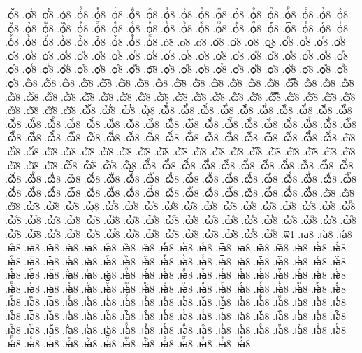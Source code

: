 {.ѻ҆᷶8
.ѻ᷷҆8
.ѻ᷸҆8
.ѻ᷹҆8
.ѻ҆ⷠ8
.ѻ҆ⷡ8
.ѻ҆ⷢ8
.ѻ҆ⷣ8
.ѻ҆ⷤ8
.ѻ҆ⷥ8
.ѻ҆ⷦ8
.ѻ҆ⷧ8
.ѻ҆ⷨ8
.ѻ҆ⷩ8
.ѻ҆ⷪ8
.ѻ҆ⷫ8
.ѻ҆ⷬ8
.ѻ҆ⷭ8
.ѻ҆ⷮ8
.ѻ҆ⷯ8
.ѻ҆ⷰ8
.ѻ҆ⷱ8
.ѻ҆ⷲ8
.ѻ҆ⷳ8
.ѻ҆ⷴ8
.ѻ҆ⷵ8
.ѻ҆ⷶ8
.ѻ҆ⷷ8
.ѻ҆ⷸ8
.ѻ҆ⷹ8
.ѻ҆ⷺ8
.ѻ҆ⷻ8
.ѻ҆ⷼ8
.ѻ҆ⷽ8
.ѻ҆ⷾ8
.ѻ҆ⷿ8
.ѻ҆꙯8
.ѻ҆ꙴ8
.ѻ҆ꙵ8
.ѻ҆ꙶ8
.ѻ҆ꙷ8
.ѻ҆ꙸ8
.ѻ҆ꙹ8
.ѻ҆ꙺ8
.ѻ҆ꙻ8
.ѻ҆꙼8
.ѻ҆꙽8
.ѻ҆ꚞ8
.ѻ҆ꚟ8
.ѻ҇8
.ѻ᷀8
.ѻ᷁8
.ѻ᷶8
.ѻ᷷8
.ѻ᷸8
.ѻ᷹8
.ѻⷠ8
.ѻⷡ8
.ѻⷢ8
.ѻⷣ8
.ѻⷤ8
.ѻⷥ8
.ѻⷦ8
.ѻⷧ8
.ѻⷨ8
.ѻⷩ8
.ѻⷪ8
.ѻⷫ8
.ѻⷬ8
.ѻⷭ8
.ѻⷮ8
.ѻⷯ8
.ѻⷰ8
.ѻⷱ8
.ѻⷲ8
.ѻⷳ8
.ѻⷴ8
.ѻⷵ8
.ѻⷶ8
.ѻⷷ8
.ѻⷸ8
.ѻⷹ8
.ѻⷺ8
.ѻⷻ8
.ѻⷼ8
.ѻⷽ8
.ѻⷾ8
.ѻⷿ8
.ѻ꙯8
.ѻꙴ8
.ѻꙵ8
.ѻꙶ8
.ѻꙷ8
.ѻꙸ8
.ѻꙹ8
.ѻꙺ8
.ѻꙻ8
.ѻ꙼8
.ѻ꙽8
.ѻꚞ8
.ѻꚟ8
.ѽ8
.ѽ̀8
.ѽ́8
.ѽ̂8
.ѽ̅8
.ѽ̆8
.ѽ̇8
.ѽ̈8
.ѽ̋8
.ѽ̏8
.ѽ̑8
.ѽ̓8
.ѽ̔8
.ѽ̾8
.ѽ̿8
.ѽ͘8
.ѽ҃8
.ѽ҄8
.ѽ҅8
.ѽ҅̀8
.ѽ҅́8
.ѽ҅̂8
.ѽ҅̅8
.ѽ҅̆8
.ѽ҅̇8
.ѽ҅̈8
.ѽ҅̋8
.ѽ҅̏8
.ѽ҅̑8
.ѽ҅̓8
.ѽ҅̔8
.ѽ҅̾8
.ѽ҅̿8
.ѽ҅͘8
.ѽ҅҃8
.ѽ҅҄8
.ѽ҅҅8
.ѽ҅҆8
.ѽ҅҇8
.ѽ҅᷀8
.ѽ҅᷁8
.ѽ҅᷶8
.ѽ᷷҅8
.ѽ᷸҅8
.ѽ᷹҅8
.ѽ҅ⷠ8
.ѽ҅ⷡ8
.ѽ҅ⷢ8
.ѽ҅ⷣ8
.ѽ҅ⷤ8
.ѽ҅ⷥ8
.ѽ҅ⷦ8
.ѽ҅ⷧ8
.ѽ҅ⷨ8
.ѽ҅ⷩ8
.ѽ҅ⷪ8
.ѽ҅ⷫ8
.ѽ҅ⷬ8
.ѽ҅ⷭ8
.ѽ҅ⷮ8
.ѽ҅ⷯ8
.ѽ҅ⷰ8
.ѽ҅ⷱ8
.ѽ҅ⷲ8
.ѽ҅ⷳ8
.ѽ҅ⷴ8
.ѽ҅ⷵ8
.ѽ҅ⷶ8
.ѽ҅ⷷ8
.ѽ҅ⷸ8
.ѽ҅ⷹ8
.ѽ҅ⷺ8
.ѽ҅ⷻ8
.ѽ҅ⷼ8
.ѽ҅ⷽ8
.ѽ҅ⷾ8
.ѽ҅ⷿ8
.ѽ҅꙯8
.ѽ҅ꙴ8
.ѽ҅ꙵ8
.ѽ҅ꙶ8
.ѽ҅ꙷ8
.ѽ҅ꙸ8
.ѽ҅ꙹ8
.ѽ҅ꙺ8
.ѽ҅ꙻ8
.ѽ҅꙼8
.ѽ҅꙽8
.ѽ҅ꚞ8
.ѽ҅ꚟ8
.ѽ҆8
.ѽ҆̀8
.ѽ҆́8
.ѽ҆̂8
.ѽ҆̅8
.ѽ҆̆8
.ѽ҆̇8
.ѽ҆̈8
.ѽ҆̋8
.ѽ҆̏8
.ѽ҆̑8
.ѽ҆̓8
.ѽ҆̔8
.ѽ҆̾8
.ѽ҆̿8
.ѽ҆͘8
.ѽ҆҃8
.ѽ҆҄8
.ѽ҆҅8
.ѽ҆҆8
.ѽ҆҇8
.ѽ҆᷀8
.ѽ҆᷁8
.ѽ҆᷶8
.ѽ᷷҆8
.ѽ᷸҆8
.ѽ᷹҆8
.ѽ҆ⷠ8
.ѽ҆ⷡ8
.ѽ҆ⷢ8
.ѽ҆ⷣ8
.ѽ҆ⷤ8
.ѽ҆ⷥ8
.ѽ҆ⷦ8
.ѽ҆ⷧ8
.ѽ҆ⷨ8
.ѽ҆ⷩ8
.ѽ҆ⷪ8
.ѽ҆ⷫ8
.ѽ҆ⷬ8
.ѽ҆ⷭ8
.ѽ҆ⷮ8
.ѽ҆ⷯ8
.ѽ҆ⷰ8
.ѽ҆ⷱ8
.ѽ҆ⷲ8
.ѽ҆ⷳ8
.ѽ҆ⷴ8
.ѽ҆ⷵ8
.ѽ҆ⷶ8
.ѽ҆ⷷ8
.ѽ҆ⷸ8
.ѽ҆ⷹ8
.ѽ҆ⷺ8
.ѽ҆ⷻ8
.ѽ҆ⷼ8
.ѽ҆ⷽ8
.ѽ҆ⷾ8
.ѽ҆ⷿ8
.ѽ҆꙯8
.ѽ҆ꙴ8
.ѽ҆ꙵ8
.ѽ҆ꙶ8
.ѽ҆ꙷ8
.ѽ҆ꙸ8
.ѽ҆ꙹ8
.ѽ҆ꙺ8
.ѽ҆ꙻ8
.ѽ҆꙼8
.ѽ҆꙽8
.ѽ҆ꚞ8
.ѽ҆ꚟ8
.ѽ҇8
.ѽ᷀8
.ѽ᷁8
.ѽ᷶8
.ѽ᷷8
.ѽ᷸8
.ѽ᷹8
.ѽⷠ8
.ѽⷡ8
.ѽⷢ8
.ѽⷣ8
.ѽⷤ8
.ѽⷥ8
.ѽⷦ8
.ѽⷧ8
.ѽⷨ8
.ѽⷩ8
.ѽⷪ8
.ѽⷫ8
.ѽⷬ8
.ѽⷭ8
.ѽⷮ8
.ѽⷯ8
.ѽⷰ8
.ѽⷱ8
.ѽⷲ8
.ѽⷳ8
.ѽⷴ8
.ѽⷵ8
.ѽⷶ8
.ѽⷷ8
.ѽⷸ8
.ѽⷹ8
.ѽⷺ8
.ѽⷻ8
.ѽⷼ8
.ѽⷽ8
.ѽⷾ8
.ѽⷿ8
.ѽ꙯8
.ѽꙴ8
.ѽꙵ8
.ѽꙶ8
.ѽꙷ8
.ѽꙸ8
.ѽꙹ8
.ѽꙺ8
.ѽꙻ8
.ѽ꙼8
.ѽ꙽8
.ѽꚞ8
.ѽꚟ8
.ѿ1
.ꙗ8
.ꙗ̀8
.ꙗ́8
.ꙗ̂8
.ꙗ̅8
.ꙗ̆8
.ꙗ̇8
.ꙗ̈8
.ꙗ̋8
.ꙗ̏8
.ꙗ̑8
.ꙗ̓8
.ꙗ̔8
.ꙗ̾8
.ꙗ̿8
.ꙗ͘8
.ꙗ҃8
.ꙗ҄8
.ꙗ҅8
.ꙗ҅̀8
.ꙗ҅́8
.ꙗ҅̂8
.ꙗ҅̅8
.ꙗ҅̆8
.ꙗ҅̇8
.ꙗ҅̈8
.ꙗ҅̋8
.ꙗ҅̏8
.ꙗ҅̑8
.ꙗ҅̓8
.ꙗ҅̔8
.ꙗ҅̾8
.ꙗ҅̿8
.ꙗ҅͘8
.ꙗ҅҃8
.ꙗ҅҄8
.ꙗ҅҅8
.ꙗ҅҆8
.ꙗ҅҇8
.ꙗ҅᷀8
.ꙗ҅᷁8
.ꙗ҅᷶8
.ꙗ᷷҅8
.ꙗ᷸҅8
.ꙗ᷹҅8
.ꙗ҅ⷠ8
.ꙗ҅ⷡ8
.ꙗ҅ⷢ8
.ꙗ҅ⷣ8
.ꙗ҅ⷤ8
.ꙗ҅ⷥ8
.ꙗ҅ⷦ8
.ꙗ҅ⷧ8
.ꙗ҅ⷨ8
.ꙗ҅ⷩ8
.ꙗ҅ⷪ8
.ꙗ҅ⷫ8
.ꙗ҅ⷬ8
.ꙗ҅ⷭ8
.ꙗ҅ⷮ8
.ꙗ҅ⷯ8
.ꙗ҅ⷰ8
.ꙗ҅ⷱ8
.ꙗ҅ⷲ8
.ꙗ҅ⷳ8
.ꙗ҅ⷴ8
.ꙗ҅ⷵ8
.ꙗ҅ⷶ8
.ꙗ҅ⷷ8
.ꙗ҅ⷸ8
.ꙗ҅ⷹ8
.ꙗ҅ⷺ8
.ꙗ҅ⷻ8
.ꙗ҅ⷼ8
.ꙗ҅ⷽ8
.ꙗ҅ⷾ8
.ꙗ҅ⷿ8
.ꙗ҅꙯8
.ꙗ҅ꙴ8
.ꙗ҅ꙵ8
.ꙗ҅ꙶ8
.ꙗ҅ꙷ8
.ꙗ҅ꙸ8
.ꙗ҅ꙹ8
.ꙗ҅ꙺ8
.ꙗ҅ꙻ8
.ꙗ҅꙼8
.ꙗ҅꙽8
.ꙗ҅ꚞ8
.ꙗ҅ꚟ8
.ꙗ҆8
.ꙗ҆̀8
.ꙗ҆́8
.ꙗ҆̂8
.ꙗ҆̅8
.ꙗ҆̆8
.ꙗ҆̇8
.ꙗ҆̈8
.ꙗ҆̋8
.ꙗ҆̏8
.ꙗ҆̑8
.ꙗ҆̓8
.ꙗ҆̔8
.ꙗ҆̾8
.ꙗ҆̿8
.ꙗ҆͘8
.ꙗ҆҃8
.ꙗ҆҄8
.ꙗ҆҅8
.ꙗ҆҆8
.ꙗ҆҇8
.ꙗ҆᷀8
.ꙗ҆᷁8
.ꙗ҆᷶8
.ꙗ᷷҆8
.ꙗ᷸҆8
.ꙗ᷹҆8
.ꙗ҆ⷠ8
.ꙗ҆ⷡ8
.ꙗ҆ⷢ8
.ꙗ҆ⷣ8
.ꙗ҆ⷤ8
.ꙗ҆ⷥ8
.ꙗ҆ⷦ8
.ꙗ҆ⷧ8
.ꙗ҆ⷨ8
.ꙗ҆ⷩ8
.ꙗ҆ⷪ8
.ꙗ҆ⷫ8
.ꙗ҆ⷬ8
.ꙗ҆ⷭ8
.ꙗ҆ⷮ8
.ꙗ҆ⷯ8
.ꙗ҆ⷰ8
.ꙗ҆ⷱ8
.ꙗ҆ⷲ8
.ꙗ҆ⷳ8
.ꙗ҆ⷴ8
.ꙗ҆ⷵ8
.ꙗ҆ⷶ8
.ꙗ҆ⷷ8
.ꙗ҆ⷸ8
}
